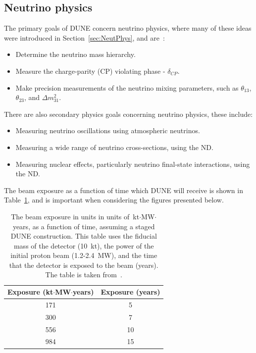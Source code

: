 \subsection{Neutrino physics} \label{sec:DUNEPhys_Neut} %
The primary goals of DUNE concern neutrino physics, where many of these ideas were introduced in Section~\ref{sec:NeutPhys}, and are~\citep{DUNECDR_V2}:
\begin{itemize}
\item Determine the neutrino mass hierarchy.
\item Measure the charge-parity (CP) violating phase - $\delta_{CP}$.
\item Make precision measurements of the neutrino mixing parameters, such as $\theta_{13}$, $\theta_{23}$, and $\Delta m^{2}_{31}$.
\end{itemize}
There are also secondary physics goals concerning neutrino physics, these include:
\begin{itemize}
\item Measuring neutrino oscillations using atmospheric neutrinos.
\item Measuring a wide range of neutrino cross-sections, using the ND.
\item Measuring nuclear effects, particularly neutrino final-state interactions, using the ND.
\end{itemize}
The beam exposure as a function of time which DUNE will receive is shown in Table~\ref{tab:DUNEExposure}, and is important when considering the figures presented below. \\

\begin{table}
\caption[The beam exposure in units in units of~kt$\cdot$MW$\cdot$years, as a function of time, assuming a staged DUNE construction]
        {The beam exposure in units in units of~kt$\cdot$MW$\cdot$years, as a function of time, assuming a staged DUNE construction. This table uses the fiducial mass of the detector (10~kt), the power of the initial proton beam (1.2-2.4~MW), and the time that the detector is exposed to the beam (years). The table is taken from~\citep{Elizabeth_01_17}.}
\centering
\label{tab:DUNEExposure}
\begin{tabular}{c c}
\toprule
{Exposure (kt$\cdot$MW$\cdot$years)} & {Exposure (years)} \\
\midrule
171                      & 5 \\

300                      & 7 \\

556                      & 10 \\

984                      & 15 \\
\bottomrule
\end{tabular}
\end{table}


